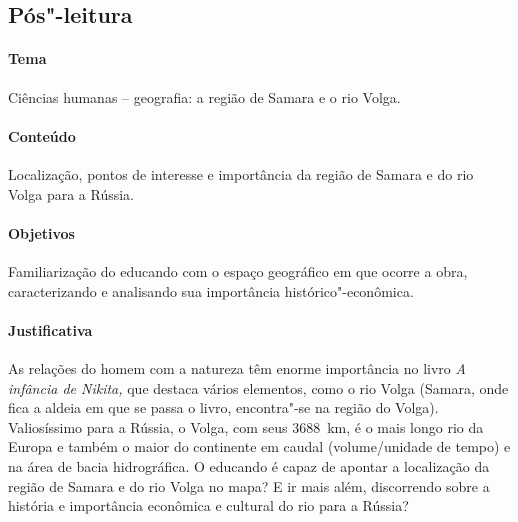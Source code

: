 \subsection{Pós"-leitura}

\paragraph{Tema} Ciências humanas -- geografia: a região de Samara e o rio Volga.


\paragraph{Conteúdo}
Localização, pontos de interesse e importância da região de Samara e do
rio Volga para a Rússia.

\paragraph{Objetivos}
Familiarização do educando com o espaço geográfico em que ocorre a obra,
caracterizando e analisando sua importância histórico"-econômica.

\paragraph{Justificativa}
As relações do homem com a natureza têm enorme importância no livro
\emph{A infância de Nikita,} que destaca vários elementos, como o rio
Volga (Samara, onde fica a aldeia em que se passa o livro, encontra"-se na
região do Volga). Valiosíssimo para a Rússia, o Volga, com seus 3688~km,
é o mais longo rio da Europa e também o maior do
continente em caudal (volume/unidade de tempo) e na área de bacia
hidrográfica. O educando é capaz de apontar a localização da região de
Samara e do rio Volga no mapa? E ir mais além, discorrendo sobre a
história e importância econômica e cultural do rio para a Rússia?


